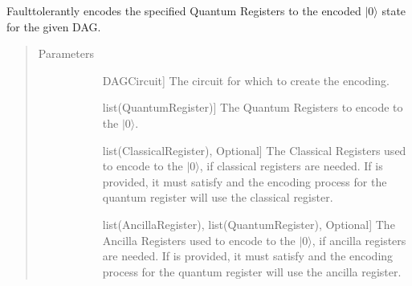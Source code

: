 \documentclass[letterpaper,10pt,english]{sphinxmanual}
\begin{document}
\begin{fulllineitems}
\begin{fulllineitems}
\begin{quote}
\begin{description}
\begin{description}
\end{description}

\end{description}\end{quote}

\end{fulllineitems}


\begin{fulllineitems}
\label{\detokenize{Base:BaseFaultTolerance.FaultTolerantEncoder.getEncoderDag}}
Fault\sphinxhyphen{}tolerantly encodes the specified Quantum Registers to the encoded \(|0\rangle\) state for the given DAG.
\begin{quote}\begin{description}
\item[{Parameters}] \leavevmode\begin{description}
\item[{}] \leavevmode{[}DAGCircuit{]}
The circuit for which to create the encoding.

\item[{}] \leavevmode{[}list(QuantumRegister){]}
The Quantum Registers to encode to the \(|0\rangle\).

\item[{}] \leavevmode{[}list(ClassicalRegister), Optional{]}
The Classical Registers used to encode to the \(|0\rangle\), if classical registers are needed. If  is provided, it must satisfy  and the encoding process for the  quantum register will use the  classical register.

\item[{}] \leavevmode{[}list(AncillaRegister), list(QuantumRegister), Optional{]}
The Ancilla Registers used to encode to the \(|0\rangle\), if ancilla registers are needed. If  is provided, it must satisfy  and the encoding process for the  quantum register will use the  ancilla register.


\end{description}
\end{description}
\end{quote}
\end{fulllineitems}
\end{fulllineitems}
\end{document}
